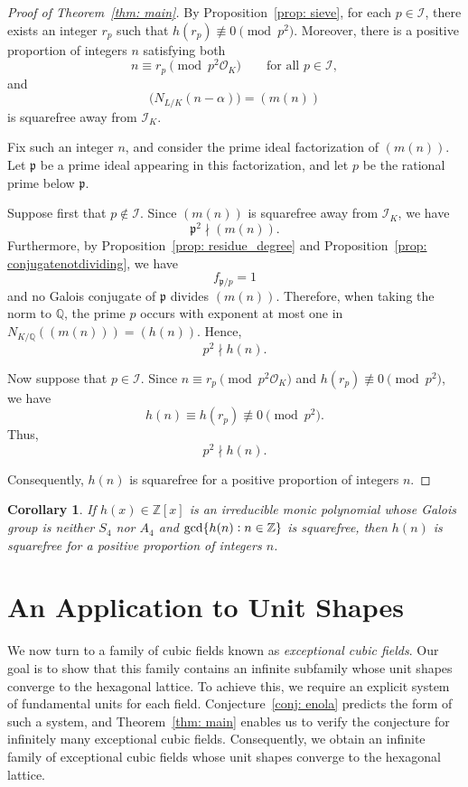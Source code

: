 \documentclass[11pt]{amsart}
\numberwithin{equation}{section}
\newtheorem{coro}[algorithm]{Corollary}
\theoremstyle{definition}
\newcommand{\ZZ}{\mathbb{Z}}
\begin{document}
\begin{proof}[Proof of Theorem~\ref{thm: main}]
    By Proposition~\ref{prop: sieve}, for each $p\in\mathcal{I}$, there exists an integer $r_p$ such that $h(r_p)\not\equiv 0\pmod{p^2}$. Moreover, there is a positive proportion of integers $n$ satisfying both
    \[
        n\equiv r_p\pmod{p^2\mathcal{O}_K} \qquad \text{for all }p\in\mathcal{I},
    \]
    and
    \[
        \bigl(N_{L/K}(n-\alpha)\bigr) = (m(n))
    \]
    is squarefree away from $\mathcal{I}_K$.
    
    Fix such an integer $n$, and consider the prime ideal factorization of $(m(n))$. Let $\mathfrak{p}$ be a prime ideal appearing in this factorization, and let $p$ be the rational prime below $\mathfrak{p}$.
    
    Suppose first that $p\notin\mathcal{I}$. Since $(m(n))$ is squarefree away from $\mathcal{I}_K$, we have
    \[
        \mathfrak{p}^2\nmid (m(n)).
    \]
    Furthermore, by Proposition~\ref{prop: residue_degree} and Proposition~\ref{prop: conjugatenotdividing}, we have
    \[
        f_{\mathfrak{p}/p}=1
    \]
    and no Galois conjugate of $\mathfrak{p}$ divides $(m(n))$. Therefore, when taking the norm to $\mathbb{Q}$, the prime $p$ occurs with exponent at most one in $N_{K/\mathbb{Q}}((m(n)))= (h(n))$. Hence,
    \[
        p^2\nmid h(n).
    \]
    
    Now suppose that $p\in\mathcal{I}$. Since $n\equiv r_p\pmod{p^2\mathcal{O}_K}$
    and $h(r_p)\not\equiv0\pmod{p^2}$, we have
    \[
        h(n)\equiv h(r_p)\not\equiv0\pmod{p^2}.
    \]
    Thus,
    \[
        p^2\nmid h(n).
    \]
    
    Consequently, $h(n)$ is squarefree for a positive proportion of integers $n$.
\end{proof}

\begin{coro}
    \label{coro:quartics}
    If $h(x) \in \ZZ[x]$ is an irreducible monic polynomial whose Galois group is neither  $S_4$ nor $A_4$ and $\gcd\{h(n) \vcentcolon n\in \ZZ\}$ is squarefree, then $h(n)$ is squarefree for a positive proportion of integers $n$.
\end{coro}

\section{An Application to Unit Shapes}

We now turn to a family of cubic fields known as \emph{exceptional cubic fields}. Our goal is to show that this family contains an infinite subfamily whose unit shapes converge to the hexagonal lattice. To achieve this, we require an explicit system of fundamental units for each field. Conjecture~\ref{conj: enola} predicts the form of such a system, and Theorem~\ref{thm: main} enables us to verify the conjecture for infinitely many exceptional cubic fields. Consequently, we obtain an infinite family of exceptional cubic fields whose unit shapes converge to the hexagonal lattice.
\end{document}
